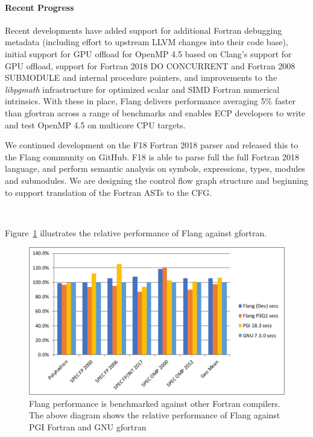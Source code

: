 \paragraph{Recent Progress}
Recent developments have added support for additional Fortran debugging metadata
(including effort to upstream LLVM changes into their code base),
initial support for GPU offload for OpenMP 4.5 \cite{openmp-spec-45} based on
Clang's support for GPU offload,
support for Fortran 2018 DO CONCURRENT and
Fortran 2008 SUBMODULE and internal procedure pointers,
and improvements to the \emph{libpgmath} infrastructure for optimized
scalar and SIMD Fortran numerical intrinsics. With these in place, Flang delivers
performance averaging 5\% faster than gfortran across a range of benchmarks and
enables ECP developers to write and test OpenMP 4.5 on multicore CPU targets.

We continued development on the F18 Fortran 2018 parser and released this to the
Flang community on GitHub.
F18 is able to parse full the full Fortran 2018 language,
and perform semantic analysis on symbols, expressions,
types, modules and submodules.
We are designing the control flow graph structure and beginning
to support translation of the Fortran ASTs to the CFG.

\

Figure~\ref{fig:flang-performance} illustrates the relative performance of Flang against gfortran.

\begin{figure}[htb]
	\centering
	\includegraphics[width=6in]{projects/2.3.5-Ecosystem/2.3.5.06-Flang/flang-performance}
	\caption{\label{fig:flang-performance}Flang performance is benchmarked against other Fortran compilers. The above diagram shows the relative performance of Flang against PGI Fortran and GNU gfortran}
\end{figure}

